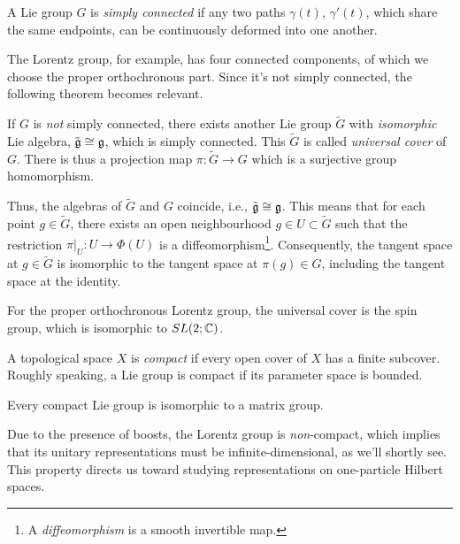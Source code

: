 \begin{definition}\label{def:simply-connected}
    A Lie group $G$ is \emph{simply connected} if any two paths $\gamma(t)$, $\gamma'(t)$, which share the same endpoints, can be continuously deformed into one another.
\end{definition}

The Lorentz group, for example, has four connected components, of which we choose the proper orthochronous part. Since it's not simply connected, the following theorem becomes relevant.

\begin{theorem}\label{th:universal-cover}
    If $G$ is \emph{not} simply connected, there exists another Lie group $\tilde{G}$ with \emph{isomorphic} Lie algebra, $\tilde{\mathfrak{g}} \cong \mathfrak{g}$, which is simply connected. This $\tilde{G}$ is called \emph{universal cover} of $G$. There is thus a projection map $\pi \colon \tilde{G} \to G$ which is a surjective group homomorphism.
\end{theorem}

Thus, the algebras of $\tilde{G}$ and $G$ coincide, i.e., $\tilde{\mathfrak{g}} \cong \mathfrak{g}$. This means that for each point $g \in \tilde{G}$, there exists an open neighbourhood $g \in U \subset \tilde{G}$ such that the restriction $\pi|_U \colon U \to \Phi(U)$ is a diffeomorphism\footnote{A \emph{diffeomorphism} is a smooth invertible map.}. Consequently, the tangent space at $g \in \tilde{G}$ is isomorphic to the tangent space at $\pi(g) \in G$, including the tangent space at the identity.

For the proper orthochronous Lorentz group, the universal cover is the spin group, which is isomorphic to $SL(2;\mathbb{C})$.

\begin{definition}\label{def:compact}
    A topological space $X$ is \emph{compact} if every open cover of $X$ has a finite subcover. Roughly speaking, a Lie group is compact if its parameter space is bounded.
\end{definition}

\begin{theorem}
    Every compact Lie group is isomorphic to a matrix group.
\end{theorem}

Due to the presence of boosts, the Lorentz group is \emph{non}-compact, which implies that its unitary representations must be infinite-dimensional, as we'll shortly see. This property directs us toward studying representations on one-particle Hilbert spaces.

